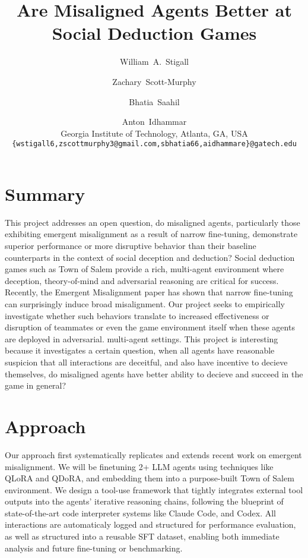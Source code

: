 \documentclass[10pt,onecolumn,letterpaper]{article}
\begin{document}
\title{Are Misaligned Agents Better at Social Deduction Games}

\author{
  William~A.~Stigall \and
  Zachary~Scott-Murphy \and
  Bhatia~Saahil \and
  Anton~Idhammar \\[0.5em]
  Georgia Institute of Technology, Atlanta, GA, USA \\[0.25em]
  {\tt\small\{wstigall6,zscottmurphy3@gmail.com,sbhatia66,aidhammare\}@gatech.edu}
}




\maketitle


\section{Summary}
This project addresses an open question, do misaligned agents, particularly those exhibiting emergent misalignment as a result of narrow fine-tuning, demonstrate superior performance or more disruptive behavior than their baseline counterparts in the context of social deception and deduction? Social deduction games such as Town of Salem provide a rich, multi-agent environment where deception, theory-of-mind and adversarial reasoning are critical for success. Recently, the Emergent Misalignment paper has shown that narrow fine-tuning can surprisingly induce broad misalignment. Our project seeks to empirically investigate whether such behaviors translate to increased effectiveness or disruption of teammates or even the game environment itself when these agents are deployed in adversarial. multi-agent settings. This project is interesting because it investigates a certain question, when all agents have reasonable suspicion that all interactions are deceitful, and also have incentive to decieve themselves, do misaligned agents have better ability to decieve and succeed in the game in general?
\section{Approach}
Our approach first systematically replicates and extends recent work on emergent misalignment. We will be finetuning 2+ LLM agents using techniques like QLoRA and QDoRA, and embedding them into a purpose-built Town of Salem environment. We design a tool-use framework that tightly integrates external tool outputs into the agents' iterative reasoning chains, following the blueprint of state-of-the-art code interpreter systems like Claude Code, and Codex. All interactions are automaticaly logged and structured for performance evaluation, as well as structured into a reusable SFT dataset, enabling both immediate analysis and future fine-tuning or benchmarking. 
\end{document}
